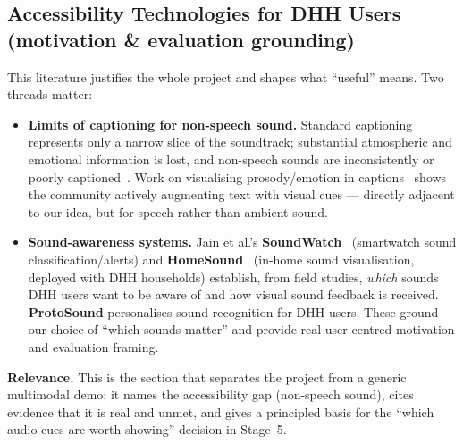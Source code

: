 \documentclass[11pt,a4paper]{article}
\begin{document}
\subsection{Accessibility Technologies for DHH Users (motivation \& evaluation grounding)}
This literature justifies the whole project and shapes what ``useful'' means. Two threads matter:
\begin{itemize}
  \item \textbf{Limits of captioning for non-speech sound.} Standard captioning represents only a
    narrow slice of the soundtrack; substantial atmospheric and emotional information is lost, and
    non-speech sounds are inconsistently or poorly captioned~\cite{captionlimits}. Work on
    visualising prosody/emotion in captions~\cite{prosodycaptions} shows the community actively
    augmenting text with visual cues --- directly adjacent to our idea, but for speech rather than
    ambient sound.
  \item \textbf{Sound-awareness systems.} Jain et al.'s \textbf{SoundWatch}~\cite{soundwatch}
    (smartwatch sound classification/alerts) and \textbf{HomeSound}~\cite{homesound} (in-home sound
    visualisation, deployed with DHH households) establish, from field studies, \emph{which} sounds
    DHH users want to be aware of and how visual sound feedback is received. \textbf{ProtoSound}
    \cite{protosound} personalises sound recognition for DHH users. These ground our choice of
    ``which sounds matter'' and provide real user-centred motivation and evaluation framing.
\end{itemize}
\textbf{Relevance.} This is the section that separates the project from a generic multimodal demo:
it names the accessibility gap (non-speech sound), cites evidence that it is real and unmet, and
gives a principled basis for the ``which audio cues are worth showing'' decision in Stage~5.

\end{document}
